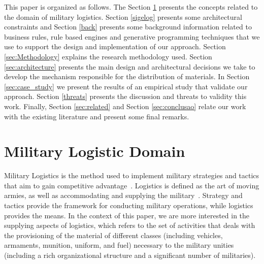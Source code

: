 \documentclass[twocolumn]{bmcart}%
\begin{document}
This paper is organized as follows. The Section \ref{sec:logistics} presents the concepts related to the domain of military logistics. Section \ref{sigelog} presents some architectural constraints and Section \ref{back} presents some background information related to business rules, rule based engines and generative programming techniques that we use to support the design and implementation of our approach. Section \ref{sec:Methodology} explains the research methodology used. Section \ref{sec:architecture} presents the main design and architectural decisions we take to develop the mechanism responsible for the distribution of materials. In Section \ref{sec:case_study} we present the results of an empirical study that validate our approach. Section \ref{threats} presents the discussion and threats to validity this work. Finally, Section \ref{sec:related} and Section \ref{sec:conclusao} relate our work with the existing literature and present some final remarks.









\section{Military Logistic Domain}
\label{sec:logistics}

Military Logistics is the method used to implement military strategies and tactics that aim to gain competitive advantage~\cite{rutner2012}. Logistics is defined as the art of moving armies, as well as accommodating and supplying the military~\cite{prebilic2006}. Strategy and tactics provide the framework for conducting military operations, while logistics provides the means. In the context of this paper, we are more interested in the supplying aspects of logistics, which refers to the set of activities that deals with the  provisioning of the material of different classes (including vehicles, armaments, munition, uniform, and fuel) necessary to the military unities (including a rich organizational structure and a significant number of militaries). 
\end{document}
